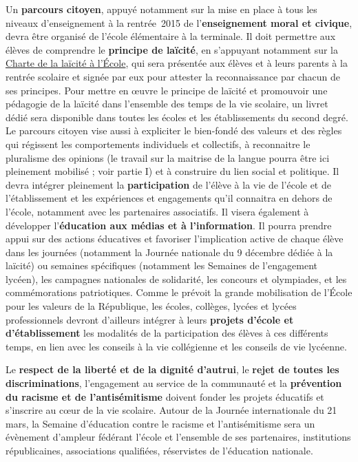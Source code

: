 Un \textbf{parcours citoyen}, appuyé notamment sur la mise en place à tous les niveaux d’enseignement à la rentrée~2015 de l’\textbf{enseignement moral et civique}, devra être organisé de l’école élémentaire à la terminale. Il doit permettre aux élèves de comprendre le \textbf{principe de laïcité}, en s’appuyant notamment sur la \href{http://www.education.gouv.fr/pid25535/bulletin_officiel.html?cid_bo=73659}{Charte de la laïcité à l’École}, qui sera présentée aux élèves et à leurs parents à la rentrée scolaire et signée par eux pour attester la reconnaissance par chacun de ses principes. Pour mettre en œuvre le principe de laïcité et promouvoir une pédagogie de la laïcité dans l’ensemble des temps de la vie scolaire, un livret dédié sera disponible dans toutes les écoles et les établissements du second degré. Le parcours citoyen vise aussi à expliciter le bien-fondé des valeurs et des règles qui régissent les comportements individuels et collectifs, à reconnaitre le pluralisme des opinions (le travail sur la maitrise de la langue pourra être ici pleinement mobilisé ; voir partie I) et à construire du lien social et politique. Il devra intégrer pleinement la \textbf{participation} de l’élève à la vie de l’école et de l’établissement et les expériences et engagements qu’il connaitra en dehors de l’école, notamment avec les partenaires associatifs. Il visera également à développer l’\textbf{éducation aux médias et à l’information}. Il pourra prendre appui sur des actions éducatives et favoriser l’implication active de chaque élève dans les journées (notamment la Journée nationale du 9 décembre dédiée à la laïcité) ou semaines spécifiques (notamment les Semaines de l’engagement lycéen), les campagnes nationales de solidarité, les concours et olympiades, et les commémorations patriotiques. Comme le prévoit la grande mobilisation de l’École pour les valeurs de la République, les écoles, collèges, lycées et lycées professionnels devront d’ailleurs intégrer à leurs \textbf{projets d’école et d’établissement} les modalités de la participation des élèves à ces différents temps, en lien avec les conseils à la vie collégienne et les conseils de vie lycéenne.

Le \textbf{respect de la liberté et de la dignité d’autrui}, le \textbf{rejet de toutes les discriminations}, l’engagement au service de la communauté et la \textbf{prévention du racisme et de l’antisémitisme} doivent fonder les projets éducatifs et s’inscrire au cœur de la vie scolaire. Autour de la Journée internationale du 21 mars, la Semaine d’éducation contre le racisme et l’antisémitisme sera un évènement d’ampleur fédérant l’école et l’ensemble de ses partenaires, institutions républicaines, associations qualifiées, réservistes de l’éducation nationale.


